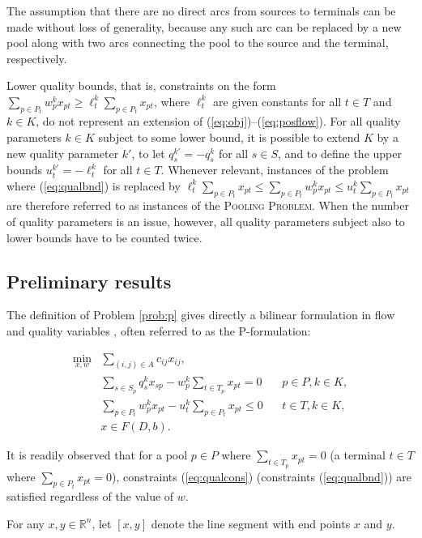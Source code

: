 \documentclass[smallcondensed]{svjour3}
\begin{document}
The assumption that there are no direct arcs from sources to terminals can be made without loss of generality,
because any such arc can be replaced by a new pool along with two arcs connecting the pool to the source and the terminal, respectively.

Lower quality bounds, that is, constraints on the form $\sum_{p\in P_t}w_p^kx_{pt} \geq \ell_t^k\sum_{p\in P_t}x_{pt}$, where $\ell_t^k$ are given constants for all $t\in T$ and $k\in K$,
do not represent an extension of (\ref{eq:obj})--(\ref{eq:posflow}).
For all quality parameters $k\in K$ subject to some lower bound, it is possible to extend $K$ by a new quality parameter $k'$,
to let $q_s^{k'}=-q_s^k$ for all $s\in S$, and to define the upper bounds $u_t^{k'}=-\ell_t^k$ for all $t\in T$.
Whenever relevant, instances of the problem where (\ref{eq:qualbnd}) is replaced by
$\ell_t^k\sum_{p\in P_t}x_{pt}\leq\sum_{p\in P_t}w_p^kx_{pt}\leq u_t^k\sum_{p\in P_t}x_{pt}$ are therefore referred to as instances of the \textsc{Pooling Problem}.
When the number of quality parameters is an issue, however, all quality parameters subject also to lower bounds have to be counted twice.


\subsection{Preliminary results} \label{sec:res}

The definition of Problem \ref{prob:p} gives directly a bilinear formulation in flow and quality variables \cite{haverly78},
often referred to as the P-formulation:

\begin{eqnarray}
\min_{x,w} & \sum_{(i,j)\in A}c_{ij}x_{ij}, & \label{eq:obj} \\
           & \sum_{s\in S_p}q_s^kx_{sp}-w_p^k\sum_{t\in T_p}x_{pt} = 0~~~~ & p\in P, k\in K, \label{eq:qualcons} \\
           & \sum_{p\in P_t}w_p^kx_{pt}-u_t^k\sum_{p\in P_t}x_{pt} \leq 0~~~~ & t\in T, k\in K, \label{eq:qualbnd} \\
           & x\in F(D,b). \label{eq:posflow}
\end{eqnarray}

\noindent
It is readily observed that for a pool $p\in P$ where $\sum_{t\in T_p}x_{pt}=0$ (a terminal $t\in T$ where $\sum_{p\in P_t}x_{pt}=0$),
constraints (\ref{eq:qualcons}) (constraints (\ref{eq:qualbnd})) are satisfied regardless of the value of $w$.

For any $x,y\in\mathbb{R}^n$, let $[x,y]$ denote the line segment with end points $x$ and $y$.
\end{document}
